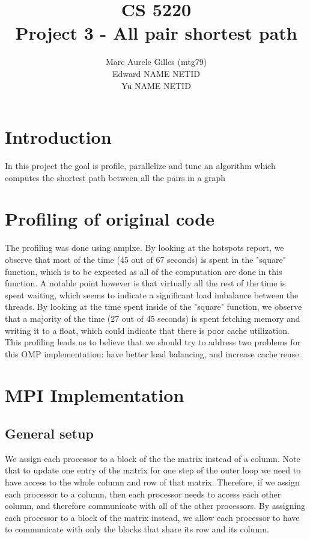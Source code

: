 \documentclass[11pt]{article}
\begin{document}
\title{CS 5220\\ Project 3 - All pair shortest path}
\author{Marc Aurele Gilles (mtg79)\\ Edward NAME NETID \\ Yu NAME NETID}
\maketitle

\section{Introduction}
In this project the goal is profile, parallelize and tune an algorithm which computes the shortest path between all the pairs in a graph


\section{Profiling of original code}
The profiling was done using amplxe. By looking at the hotspots report, we observe that most of the time (45 out of 67 seconds) is spent in the "square" function, which is to be expected as all of the computation are done in this function. A notable point however is that virtually all the rest of the time is spent waiting, which seems to indicate a significant load imbalance between the threads.
By looking at the time spent inside of the "square" function, we observe that a majority of the time (27 out of 45 seconds) is spent fetching memory and writing it to a float, which could indicate that there is poor cache utilization.
\\
This profiling leads us to believe that we should try to address two problems for this OMP implementation: have better load balancing, and increase cache reuse.


 

\section{MPI Implementation}
\subsection{General setup}
We assign each processor to a block of the the matrix instead of a column.
Note that to update one entry of the matrix for one step of the outer loop  we need to have access to the whole column and row of that matrix. Therefore, if we assign each processor to a column, then each processor needs to access each other column, and therefore communicate with all of the other processors. By assigning each processor to a block of the matrix instead, we allow each processor to have to communicate with only the blocks that share its row and its column.
\end{document}
